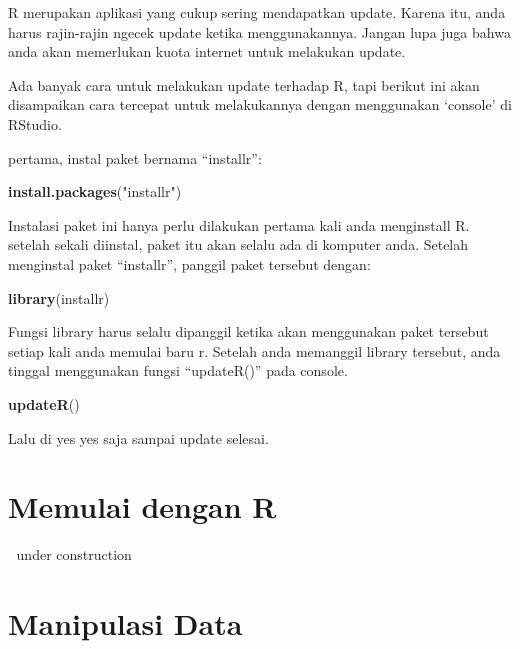 \documentclass[
]{book}
\newenvironment{Shaded}{\begin{snugshade}}{\end{snugshade}}
\newcommand{\KeywordTok}[1]{\textcolor[rgb]{0.13,0.29,0.53}{\textbf{#1}}}
\newcommand{\NormalTok}[1]{#1}
\newcommand{\StringTok}[1]{\textcolor[rgb]{0.31,0.60,0.02}{#1}}
\begin{document}
R merupakan aplikasi yang cukup sering mendapatkan update. Karena itu, anda harus rajin-rajin ngecek update ketika menggunakannya. Jangan lupa juga bahwa anda akan memerlukan kuota internet untuk melakukan update.

Ada banyak cara untuk melakukan update terhadap R, tapi berikut ini akan disampaikan cara tercepat untuk melakukannya dengan menggunakan `console' di RStudio.

pertama, instal paket bernama ``installr'':

\begin{Shaded}
\begin{Highlighting}[]
\KeywordTok{install.packages}\NormalTok{(}\StringTok{"installr"}\NormalTok{)}
\end{Highlighting}
\end{Shaded}

Instalasi paket ini hanya perlu dilakukan pertama kali anda menginstall R. setelah sekali diinstal, paket itu akan selalu ada di komputer anda. Setelah menginstal paket ``installr'', panggil paket tersebut dengan:

\begin{Shaded}
\begin{Highlighting}[]
\KeywordTok{library}\NormalTok{(installr)}
\end{Highlighting}
\end{Shaded}

Fungsi library harus selalu dipanggil ketika akan menggunakan paket tersebut setiap kali anda memulai baru r. Setelah anda memanggil library tersebut, anda tinggal menggunakan fungsi ``updateR()'' pada console.

\begin{Shaded}
\begin{Highlighting}[]
\KeywordTok{updateR}\NormalTok{()}
\end{Highlighting}
\end{Shaded}

Lalu di yes yes saja sampai update selesai.

\hypertarget{intro}{%
\chapter{Memulai dengan R}\label{intro}}

🚧 under construction 🚧

\hypertarget{manipulasi-data}{%
\chapter{Manipulasi Data}\label{manipulasi-data}}
\end{document}
